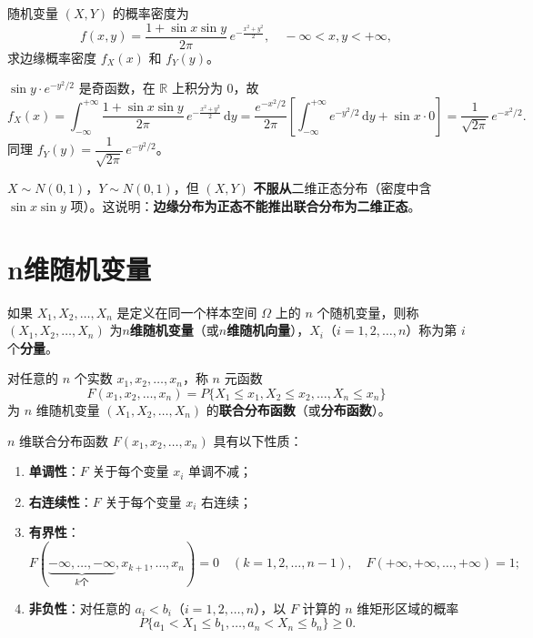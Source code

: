 \documentclass[lang=cn,11pt]{elegantbook}
\begin{document}
\begin{exercise}[边缘密度不保证联合为正态] \label{exer:3-c5}
随机变量 $(X,Y)$ 的概率密度为
\[
f(x,y) = \frac{1+\sin x\sin y}{2\pi}\,e^{-\frac{x^2+y^2}{2}}, \quad -\infty < x, y < +\infty,
\]
求边缘概率密度 $f_X(x)$ 和 $f_Y(y)$。
\end{exercise}
\begin{solution}
$\sin y \cdot e^{-y^2/2}$ 是奇函数，在 $\mathbb{R}$ 上积分为 $0$，故
\[
f_X(x) = \int_{-\infty}^{+\infty}\frac{1+\sin x\sin y}{2\pi}\,e^{-\frac{x^2+y^2}{2}}\,\mathrm{d}y = \frac{e^{-x^2/2}}{2\pi}\left[\int_{-\infty}^{+\infty}e^{-y^2/2}\,\mathrm{d}y + \sin x \cdot 0\right] = \frac{1}{\sqrt{2\pi}}\,e^{-x^2/2}.
\]
同理 $f_Y(y) = \dfrac{1}{\sqrt{2\pi}}\,e^{-y^2/2}$。
\begin{note}
$X \sim N(0,1)$，$Y \sim N(0,1)$，但 $(X,Y)$ \textbf{不服从}二维正态分布（密度中含 $\sin x\sin y$ 项）。这说明：\textbf{边缘分布为正态不能推出联合分布为二维正态}。
\end{note}
\end{solution}


\section{n维随机变量}

\begin{definition}[$n$维随机变量] \label{def:n-d-random-variable}
如果 $X_1, X_2, \dots, X_n$ 是定义在同一个样本空间 $\Omega$ 上的 $n$ 个随机变量，则称 $(X_1, X_2, \dots, X_n)$ 为\textbf{$n$维随机变量}（或\textbf{$n$维随机向量}），$X_i$（$i=1,2,\dots,n$）称为第 $i$ 个\textbf{分量}。
\end{definition}

\begin{definition}[$n$维联合分布函数] \label{def:n-joint-df}
对任意的 $n$ 个实数 $x_1, x_2, \dots, x_n$，称 $n$ 元函数
\[
F(x_1, x_2, \dots, x_n) = P\{X_1 \leqslant x_1, X_2 \leqslant x_2, \dots, X_n \leqslant x_n\}
\]
为 $n$ 维随机变量 $(X_1, X_2, \dots, X_n)$ 的\textbf{联合分布函数}（或\textbf{分布函数}）。
\end{definition}

\begin{property}[$n$维联合分布函数的性质]\label{prop:n-joint-df-property}
$n$ 维联合分布函数 $F(x_1, x_2, \dots, x_n)$ 具有以下性质：
\begin{enumerate}
    \item \textbf{单调性}：$F$ 关于每个变量 $x_i$ 单调不减；
    \item \textbf{右连续性}：$F$ 关于每个变量 $x_i$ 右连续；
    \item \textbf{有界性}：
    \[
    F(\underbrace{-\infty, \dots, -\infty}_{k\text{个}}, x_{k+1}, \dots, x_n) = 0 \quad (k=1,2,\dots,n-1), \quad F(+\infty, +\infty, \dots, +\infty) = 1;
    \]
    \item \textbf{非负性}：对任意的 $a_i < b_i$（$i=1,2,\dots,n$），以 $F$ 计算的 $n$ 维矩形区域的概率
    \[
    P\{a_1 < X_1 \leqslant b_1, \dots, a_n < X_n \leqslant b_n\} \geqslant 0.
    \]
\end{enumerate}
\end{property}
\end{document}
